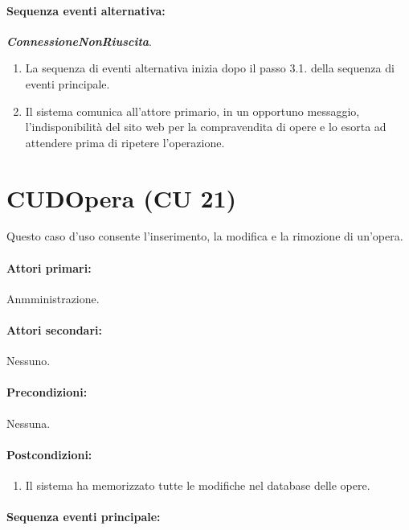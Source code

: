 \documentclass{article}
\begin{document}
	\paragraph{Sequenza eventi alternativa:} \textbf{\textit{ConnessioneNonRiuscita}}.
	\begin{enumerate}[itemsep=8pt,parsep=0pt]
				\item La sequenza di eventi alternativa inizia dopo il passo 3.1. della sequenza di eventi principale.
	\item Il sistema comunica all'attore primario, in un opportuno messaggio, l'indisponibilità del sito web per la compravendita di opere e lo esorta ad attendere prima di ripetere l'operazione.
	\end{enumerate}




	
	
	
	
	\pagebreak 
	
	 \section*{CUDOpera (CU 21)}
	
	\indent\indent Questo caso d'uso consente l’inserimento, la modifica e la rimozione di un'opera.
	
	\paragraph{Attori primari:}Anmministrazione.
	
	\paragraph{Attori secondari:}Nessuno.
	
	\paragraph{Precondizioni:}Nessuna.
	
	\paragraph{Postcondizioni:}
		\begin{enumerate}	[leftmargin=28pt]
			\item Il sistema ha memorizzato tutte le modifiche nel database delle opere.
		\end{enumerate}
	
	\paragraph{Sequenza eventi principale:}
\end{document}
